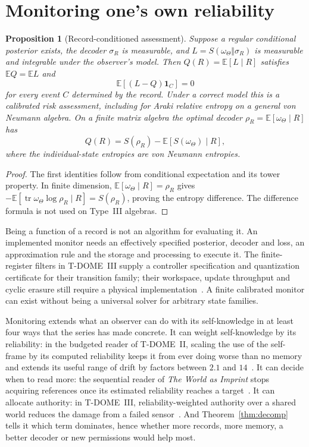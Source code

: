 \documentclass[12pt]{article}
\newtheorem{proposition}[theorem]{Proposition}
\theoremstyle{definition}
\theoremstyle{remark}
\newcommand{\E}{\mathbb E}
\newcommand{\tr}{\operatorname{tr}}
\begin{document}
\section{Monitoring one's own reliability}\label{sec:monitor}

\begin{proposition}[Record-conditioned assessment]\label{prop:monitor}
Suppose a regular conditional posterior exists, the decoder $\sigma_R$ is measurable, and $L=S(\omega_\Theta\Vert\sigma_R)$ is measurable and integrable under the observer's model. Then $Q(R)=\E[L\mid R]$ satisfies $\E Q=\E L$ and
\[
\E[(L-Q)\mathbf1_C]=0
\]
for every event $C$ determined by the record. Under a correct model this is a calibrated risk assessment, including for Araki relative entropy on a general von Neumann algebra. On a finite matrix algebra the optimal decoder $\rho_R=\E[\omega_\Theta\mid R]$ has
\[
Q(R)=S(\rho_R)-\E[S(\omega_\Theta)\mid R],
\]
where the individual-state entropies are von Neumann entropies.
\end{proposition}

\begin{proof}
The first identities follow from conditional expectation and its tower property. In finite dimension, $\E[\omega_\Theta\mid R]=\rho_R$ gives $-\E[\tr\omega_\Theta\log\rho_R\mid R]=S(\rho_R)$, proving the entropy difference. The difference formula is not used on Type~III algebras.
\end{proof}

Being a function of a record is not an algorithm for evaluating it. An implemented monitor needs an effectively specified posterior, decoder and loss, an approximation rule and the storage and processing to execute it. The finite-register filters in T-DOME~III supply a controller specification and quantization certificate for their transition family; their workspace, update throughput and cyclic erasure still require a physical implementation~\cite{TDOMEIII}. A finite calibrated monitor can exist without being a universal solver for arbitrary state families.

Monitoring extends what an observer can do with its self-knowledge in at least four ways that the series has made concrete. It can weight self-knowledge by its reliability: in the budgeted reader of T-DOME~II, scaling the use of the self-frame by its computed reliability keeps it from ever doing worse than no memory and extends its useful range of drift by factors between $2.1$ and $14$~\cite{TDOMEII}. It can decide when to read more: the sequential reader of \emph{The World as Imprint} stops acquiring references once its estimated reliability reaches a target~\cite{WorldImprint}. It can allocate authority: in T-DOME~III, reliability-weighted authority over a shared world reduces the damage from a failed sensor~\cite{TDOMEIII}. And Theorem~\ref{thm:decomp} tells it which term dominates, hence whether more records, more memory, a better decoder or new permissions would help most.
\end{document}
